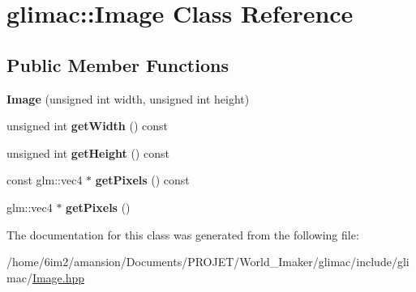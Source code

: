\hypertarget{classglimac_1_1Image}{}\section{glimac\+:\+:Image Class Reference}
\label{classglimac_1_1Image}
\subsection*{Public Member Functions}
\begin{DoxyCompactItemize}
\item 
\mbox{\label{classglimac_1_1Image_a8d0769d9756924f57b740e48e9fb09f6}} 
{\bfseries Image} (unsigned int width, unsigned int height)
\item 
\mbox{\label{classglimac_1_1Image_a23bc966575ee67b85fc575631b035026}} 
unsigned int {\bfseries get\+Width} () const
\item 
\mbox{\label{classglimac_1_1Image_a0a2afce624e3df2b12d7d76ba0d31c42}} 
unsigned int {\bfseries get\+Height} () const
\item 
\mbox{\label{classglimac_1_1Image_af2cdd4b884831808f5ecba70209c2f95}} 
const glm\+::vec4 $\ast$ {\bfseries get\+Pixels} () const
\item 
\mbox{\label{classglimac_1_1Image_a679f8ae515ad9607faa762e1e2105285}} 
glm\+::vec4 $\ast$ {\bfseries get\+Pixels} ()
\end{DoxyCompactItemize}


The documentation for this class was generated from the following file\+:\begin{DoxyCompactItemize}
\item 
/home/6im2/amansion/\+Documents/\+P\+R\+O\+J\+E\+T/\+World\+\_\+\+Imaker/glimac/include/glimac/\hyperlink{Image_8hpp}{Image.\+hpp}\end{DoxyCompactItemize}
